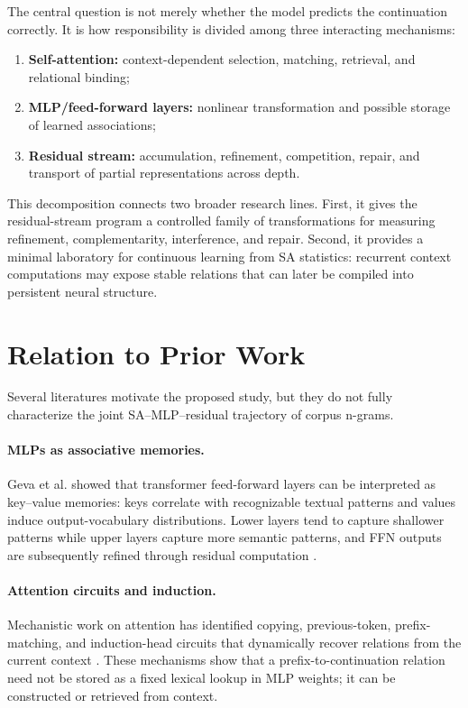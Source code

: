 \documentclass[10pt]{article}
\begin{document}
The central question is not merely whether the model predicts the continuation correctly. It is how responsibility is divided among three interacting mechanisms:
\begin{enumerate}
    \item \textbf{Self-attention:} context-dependent selection, matching, retrieval, and relational binding;
    \item \textbf{MLP/feed-forward layers:} nonlinear transformation and possible storage of learned associations;
    \item \textbf{Residual stream:} accumulation, refinement, competition, repair, and transport of partial representations across depth.
\end{enumerate}

This decomposition connects two broader research lines. First, it gives the residual-stream program a controlled family of transformations for measuring refinement, complementarity, interference, and repair. Second, it provides a minimal laboratory for continuous learning from SA statistics: recurrent context computations may expose stable relations that can later be compiled into persistent neural structure.

\section{Relation to Prior Work}
Several literatures motivate the proposed study, but they do not fully characterize the joint SA--MLP--residual trajectory of corpus n-grams.

\paragraph{MLPs as associative memories.}
Geva et al. showed that transformer feed-forward layers can be interpreted as key--value memories: keys correlate with recognizable textual patterns and values induce output-vocabulary distributions. Lower layers tend to capture shallower patterns while upper layers capture more semantic patterns, and FFN outputs are subsequently refined through residual computation \cite{geva2021ffn}.

\paragraph{Attention circuits and induction.}
Mechanistic work on attention has identified copying, previous-token, prefix-matching, and induction-head circuits that dynamically recover relations from the current context \cite{olsson2022induction}. These mechanisms show that a prefix-to-continuation relation need not be stored as a fixed lexical lookup in MLP weights; it can be constructed or retrieved from context.
\end{document}
